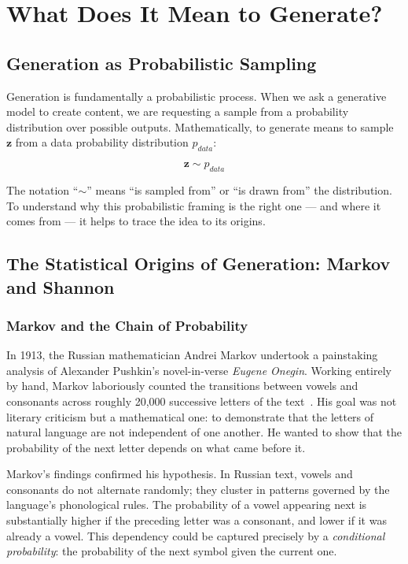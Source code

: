 \documentclass{book}
\begin{document}
\section{What Does It Mean to Generate?}

\subsection{Generation as Probabilistic Sampling}

Generation is fundamentally a probabilistic process. When we ask a generative
model to create content, we are requesting a sample from a probability
distribution over possible outputs. Mathematically, to generate means to sample
$\mathbf{z}$ from a data probability distribution $p_{data}$:

\begin{equation}
\mathbf{z} \sim p_{data}
\end{equation}

The notation ``$\sim$'' means ``is sampled from'' or ``is drawn from'' the
distribution. To understand why this probabilistic framing is the right one ---
and where it comes from --- it helps to trace the idea to its origins.

\subsection{The Statistical Origins of Generation: Markov and Shannon}

\subsubsection*{Markov and the Chain of Probability}

In 1913, the Russian mathematician Andrei Markov undertook a painstaking
analysis of Alexander Pushkin's novel-in-verse \textit{Eugene Onegin}. Working
entirely by hand, Markov laboriously counted the transitions between vowels and
consonants across roughly 20,000 successive letters of the text~\cite{markov1913}. His
goal was not literary criticism but a mathematical one: to demonstrate that the
letters of natural language are not independent of one another. He wanted to
show that the probability of the next letter depends on what came before it.

Markov's findings confirmed his hypothesis. In Russian text, vowels and
consonants do not alternate randomly; they cluster in patterns governed by the
language's phonological rules. The probability of a vowel appearing next is
substantially higher if the preceding letter was a consonant, and lower if it
was already a vowel. This dependency could be captured precisely by a
\emph{conditional probability}: the probability of the next symbol given the
current one.
\end{document}
